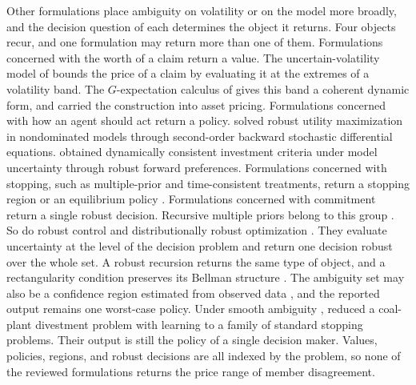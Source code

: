 \documentclass[5p,times,authoryear]{elsarticle}
\theoremstyle{plain}
\begin{document}
Other formulations place ambiguity on volatility or on the model more broadly, and the decision question of each determines the object it returns. Four objects recur, and one formulation may return more than one of them. Formulations concerned with the worth of a claim return a value. The uncertain-volatility model of \citet{Avellaneda1995} bounds the price of a claim by evaluating it at the extremes of a volatility band. The $G$-expectation calculus of \citet{Peng2019} gives this band a coherent dynamic form, and \citet{EpsteinJi2013} carried the construction into asset pricing. Formulations concerned with how an agent should act return a policy. \citet{Matoussi2015} solved robust utility maximization in nondominated models through second-order backward stochastic differential equations. \citet{Kallblad2018} obtained dynamically consistent investment criteria under model uncertainty through robust forward preferences. Formulations concerned with stopping, such as multiple-prior and time-consistent treatments, return a stopping region or an equilibrium policy \citep{Riedel2009,HuangYu2021}. Formulations concerned with commitment return a single robust decision. Recursive multiple priors belong to this group \citep{ChenEpstein2002,EpsteinSchneider2003}. So do robust control \citep{HansenSargent2001} and distributionally robust optimization \citep{MohajerinKuhn2018}. They evaluate uncertainty at the level of the decision problem and return one decision robust over the whole set. A robust recursion returns the same type of object, and a rectangularity condition preserves its Bellman structure \citep{Iyengar2005}. The ambiguity set may also be a confidence region estimated from observed data \citep{Wiesemann2013}, and the reported output remains one worst-case policy. Under smooth ambiguity \citep{Klibanoff2005}, \citet{MazzonTankov2024} reduced a coal-plant divestment problem with learning to a family of standard stopping problems. Their output is still the policy of a single decision maker. Values, policies, regions, and robust decisions are all indexed by the problem, so none of the reviewed formulations returns the price range of member disagreement.
\end{document}
